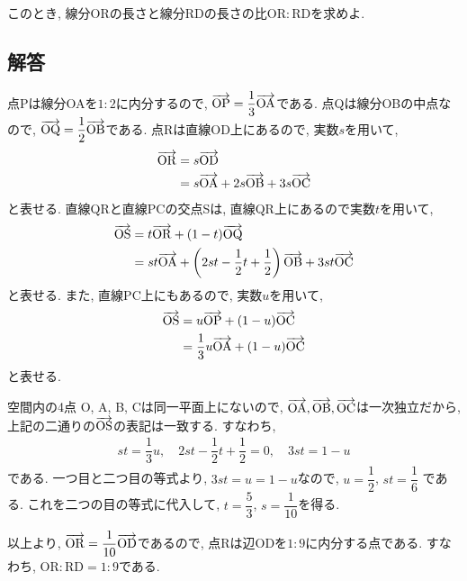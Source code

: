 \documentclass[dvipdfmx,a4paper]{jsarticle}
\begin{document}
    このとき, 線分ORの長さと線分RDの長さの比$\mathrm{OR} : \mathrm{RD}$を求めよ. 
    \subsection{解答}
    点Pは線分OAを$1 : 2$に内分するので, $\overrightarrow{\mathrm{OP}} = \dfrac{1}{3}\overrightarrow{\mathrm{OA}}$である. 
    点Qは線分OBの中点なので, $\overrightarrow{\mathrm{OQ}} = \dfrac{1}{2}\overrightarrow{\mathrm{OB}}$である. 
    点Rは直線OD上にあるので, 実数$s$を用いて, 
    \begin{align*}
        \overrightarrow{\mathrm{OR}} &= s \overrightarrow{\mathrm{OD}} \\
        &= s\overrightarrow{\mathrm{OA}} + 2s\overrightarrow{\mathrm{OB}} + 3s\overrightarrow{\mathrm{OC}}
    \end{align*}
    と表せる. 直線QRと直線PCの交点Sは, 直線QR上にあるので実数$t$を用いて, 
    \begin{align*}
        \overrightarrow{\mathrm{OS}} &= t \overrightarrow{\mathrm{OR}} + (1-t) \overrightarrow{\mathrm{OQ}}\\
        &= st\overrightarrow{\mathrm{OA}} + \left(2st-\dfrac{1}{2}t+\dfrac{1}{2}\right)\overrightarrow{\mathrm{OB}} + 3st\overrightarrow{\mathrm{OC}} \\
    \end{align*}
    と表せる. また, 直線PC上にもあるので, 実数$u$を用いて, 
    \begin{align*}
        \overrightarrow{\mathrm{OS}} &= u \overrightarrow{\mathrm{OP}} + (1-u) \overrightarrow{\mathrm{OC}}\\
        &= \dfrac{1}{3}u \overrightarrow{\mathrm{OA}} + (1-u) \overrightarrow{\mathrm{OC}}
    \end{align*}
    と表せる. 
    
    空間内の4点 O, A, B, Cは同一平面上にないので, $\overrightarrow{\mathrm{OA}},\overrightarrow{\mathrm{OB}},\overrightarrow{\mathrm{OC}}$は一次独立だから, 
    上記の二通りの$\overrightarrow{\mathrm{OS}}$の表記は一致する. すなわち, 
    \begin{align*}
        st = \dfrac{1}{3}u, \quad 2st-\dfrac{1}{2}t+\dfrac{1}{2} = 0, \quad 3st = 1-u
    \end{align*}
    である. 一つ目と二つ目の等式より, $3st=u=1-u$なので, $u = \dfrac{1}{2}$, $st = \dfrac{1}{6}$
    である. これを二つの目の等式に代入して, $t = \dfrac{5}{3}$, $s = \dfrac{1}{10}$を得る. 

    以上より, $\overrightarrow{\mathrm{OR}} =  \dfrac{1}{10}\overrightarrow{\mathrm{OD}}$であるので, 点Rは辺ODを$1:9$に内分する点である. 
    すなわち, $\mathrm{OR} : \mathrm{RD} = 1:9$である. 
\end{document}
